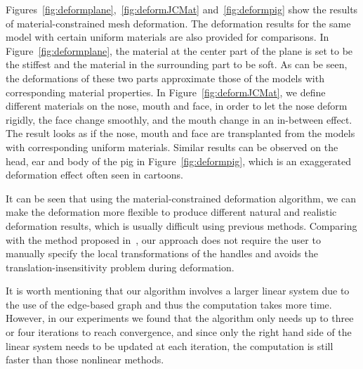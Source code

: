 Figures~\ref{fig:deformplane},~\ref{fig:deformJCMat}
and~\ref{fig:deformpig}  show the results of material-constrained
mesh deformation. The deformation results for the same model with
certain uniform materials are also provided for comparisons. In
Figure~\ref{fig:deformplane}, the material at the center part of the
plane is set to be the stiffest and the material in the surrounding
part to be soft. As can be seen, the deformations of these two parts
approximate those of the models with corresponding material
properties. In Figure~\ref{fig:deformJCMat}, we define different
materials on the nose, mouth and face, in order to let the nose
deform rigidly, the face change smoothly, and the mouth change in an
in-between effect. The result looks as if the nose, mouth and face
are transplanted from the models with corresponding uniform
materials. Similar results can be observed on the head, ear and body
of the pig in Figure~\ref{fig:deformpig}, which is an exaggerated
deformation effect often seen in cartoons.

It can be seen that using the  material-constrained deformation
algorithm, we can make the deformation more flexible to produce
different natural and realistic deformation results, which is
usually difficult using previous methods. Comparing with the method
proposed in~\cite{PJS05}, our approach does not require the user to
manually specify the local transformations of the handles and avoids
the translation-insensitivity problem during deformation.

It is worth mentioning that our algorithm  involves a larger linear
system due to the use of the edge-based graph and thus the
computation takes more time. However, in our experiments we found
that the algorithm only needs up to three or four iterations  to
reach convergence, and since only the right hand side of the linear
system needs to be updated at each iteration, the computation is
still  faster than those nonlinear methods.

